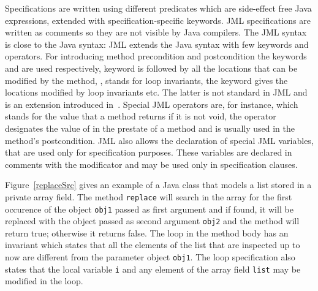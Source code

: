     Specifications are written using different predicates
    which are side-effect free Java expressions, extended with
    specification-specific keywords. JML specifications are written as comments so they are not
    visible by Java compilers. The JML syntax is close to the Java syntax: JML extends the Java
    syntax with few keywords and operators. 
    For introducing method precondition and postcondition the keywords  and  are used  
    respectively,   keyword is followed by all the locations that can be modified by the method, 
    , stands for loop invariants, the  keyword gives the 
    locations modified by loop invariants etc. The latter is not standard in JML and is an extension introduced in~\cite{BRL-JACK}.
    Special JML operators are, for instance,  which stands for the value that a method returns if it is not
    void, the  operator 
    designates the value of  in the prestate of a method and is usually
    used in the method's postcondition. JML also allows the declaration of special JML variables, that are used only for specification purposes. 
    These variables are declared in comments with the  modificator and may be used only in specification clauses. 



     
Figure~\ref{replaceSrc} gives an example of a Java class that models a list stored in a private array field. 
The method \texttt{replace} will search in the array for the first occurence of the object \texttt{obj1} passed as first argument and if found, it will be replaced with the object passed as second argument \texttt{obj2} and the method will return true; otherwise it returns false. The loop in the method body has an invariant which states that all the elements of the list that are inspected up to now are different from the parameter object \texttt{obj1}. The loop specification also states
that the local variable \texttt{i} and any element of the array field \texttt{list} may be modified in the loop.

